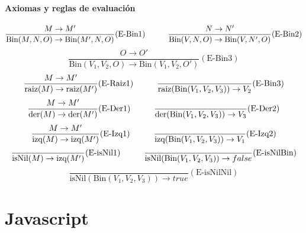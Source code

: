 \paragraph{Axiomas y reglas de evaluación}
\begin{equation*}
	\frac{M\to M'}{\text{Bin}(M,N,O)\to \text{Bin}(M',N,O)}(\text{E-Bin1})\hspace*{1cm}\frac{N\to N'}{\text{Bin}(V,N,O)\to \text{Bin}(V,N',O)}(\text{E-Bin2})
\end{equation*}
\vspace*{5mm}
\begin{equation*}
	\frac{O\to O'}{\text{Bin}(V_1,V_2,O)\to \text{Bin}(V_1,V_2,O')}(\text{E-Bin3})
\end{equation*}
\vspace*{5mm}
\begin{equation*}
	\frac{M\to M'}{\text{raiz}(M)\to\text{raiz}(M')}(\text{E-Raiz1})\hspace*{1cm}\frac{}{\text{raiz}(\text{Bin}(V_1,V_2,V_3))\to V_2}(\text{E-Bin3})
\end{equation*}
\vspace*{5mm}
\begin{equation*}
	\frac{M\to M'}{\text{der}(M)\to\text{der}(M')}(\text{E-Der1})\hspace*{1cm}\frac{}{\text{der}(\text{Bin}(V_1,V_2,V_3))\to V_3}(\text{E-Der2})
\end{equation*}
\vspace*{5mm}
\begin{equation*}
	\frac{M\to M'}{\text{izq}(M)\to\text{izq}(M')}(\text{E-Izq1})\hspace*{1cm}\frac{}{\text{izq}(\text{Bin}(V_1,V_2,V_3))\to V_1}(\text{E-Izq2})
\end{equation*}
\hspace*{5mm}
\begin{equation*}
	\frac{}{\text{isNil}(M)\to\text{izq}(M')}(\text{E-isNil1})\hspace*{1cm}\frac{}{\text{isNil}(\text{Bin}(V_1,V_2,V_3))\to false}(\text{E-isNilBin})
\end{equation*}
\hspace*{5mm}
\begin{equation*}
	\frac{}{\text{isNil}(\text{Bin}(V_1,V_2,V_3))\to true}(\text{E-isNilNil})
\end{equation*}

\newpage
\section{Javascript}
